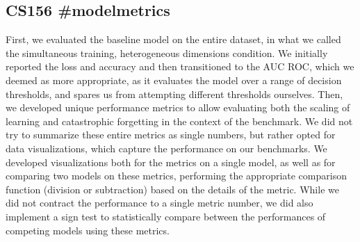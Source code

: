 \subsection{CS156 \#modelmetrics}
First, we evaluated the baseline model on the entire dataset, in what we called the simultaneous training, heterogeneous dimensions condition. We initially reported the loss and accuracy and then transitioned to the AUC ROC, which we deemed as more appropriate, as it evaluates the model over a range of decision thresholds, and spares us from attempting different thresholds ourselves. Then, we developed unique performance metrics to allow evaluating both the scaling of learning and catastrophic forgetting in the context of the benchmark. We did not try to summarize these entire metrics as single numbers, but rather opted for data visualizations, which capture the performance on our benchmarks. We developed visualizations both for the metrics on a single model, as well as for comparing two models on these metrics, performing the appropriate comparison function (division or subtraction) based on the details of the metric. While we did not contract the performance to a single metric number, we did also implement a sign test to statistically compare between the performances of competing models using these metrics.
